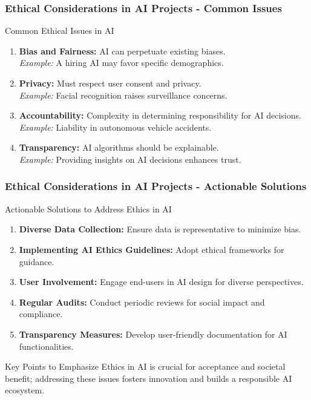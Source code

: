 \documentclass[aspectratio=169]{beamer}
\begin{document}
\begin{frame}[fragile]
    \frametitle{Ethical Considerations in AI Projects - Common Issues}
    \begin{block}{Common Ethical Issues in AI}
        \begin{enumerate}
            \item \textbf{Bias and Fairness:} AI can perpetuate existing biases. \\
            \textit{Example:} A hiring AI may favor specific demographics.
            \item \textbf{Privacy:} Must respect user consent and privacy. \\
            \textit{Example:} Facial recognition raises surveillance concerns.
            \item \textbf{Accountability:} Complexity in determining responsibility for AI decisions. \\
            \textit{Example:} Liability in autonomous vehicle accidents.
            \item \textbf{Transparency:} AI algorithms should be explainable. \\
            \textit{Example:} Providing insights on AI decisions enhances trust.
        \end{enumerate}
    \end{block}
\end{frame}

\begin{frame}[fragile]
    \frametitle{Ethical Considerations in AI Projects - Actionable Solutions}
    \begin{block}{Actionable Solutions to Address Ethics in AI}
        \begin{enumerate}
            \item \textbf{Diverse Data Collection:} Ensure data is representative to minimize bias.
            \item \textbf{Implementing AI Ethics Guidelines:} Adopt ethical frameworks for guidance.
            \item \textbf{User Involvement:} Engage end-users in AI design for diverse perspectives.
            \item \textbf{Regular Audits:} Conduct periodic reviews for social impact and compliance.
            \item \textbf{Transparency Measures:} Develop user-friendly documentation for AI functionalities.
        \end{enumerate}
    \end{block}

    \begin{block}{Key Points to Emphasize}
        Ethics in AI is crucial for acceptance and societal benefit; addressing these issues fosters innovation and builds a responsible AI ecosystem.
    \end{block}
\end{frame}
\end{document}
